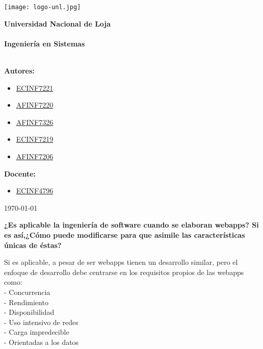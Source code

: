 \documentclass[6pt]{report}
\begin{document}
\centering
\newcommand{\titulo}{ Universidad Nacional de Loja \\ \ \\ Ingeniería en Sistemas \\ \ \\}
\newcommand{\fecha}{\today}




\pagestyle{empty}


\begin{center}\texttt{[image: logo-unl.jpg]}\end{center}


\Huge\bf\titulo
\raggedright\textbf{Autores:}
\begin{itemize}
\item \href{http://www.iralis.org/?q=node%2F10&paso=10&letra=&id=7221}{ECINF7221}
\item \href{http://www.iralis.org/?q=node%2F10&paso=10&letra=&id=7220}{AFINF7220}
\item \href{http://www.iralis.org/?q=node%2F10&paso=10&letra=B&id=7326}{AFINF7326}
\item \href{http://www.iralis.org/?q=node%2F10&paso=10&letra=E&id=7219}{ECINF7219}
\item \href{http://www.iralis.org/?q=node%2F10&paso=10&letra=G&id=7206}{AFINF7206}
\end{itemize}
\raggedright\textbf{Docente:\\}
\begin{itemize}
\item \href{http://www.iralis.org/?q=node%2F10&paso=10&letra=O&id=4796}{ECINF4796}
\end{itemize} 

\flushleft
\Large\rm\fecha

\newpage



\textbf{¿Es aplicable la ingeniería de software cuando se elaboran webapps? Si es así,¿Cómo puede modificarse para que asimile las características únicas de éstas?}

Si es aplicable, a pesar de ser webapps tienen un desarrollo similar, pero el enfoque de desarrollo debe centrarse en los requisitos propios de las webapps como:\\
- Concurrencia \\ 
- Rendimiento \\
- Disponibilidad \\
- Uso intensivo de redes \\
- Carga impredecible \\
- Orientadas a los datos \\
\end{document}

